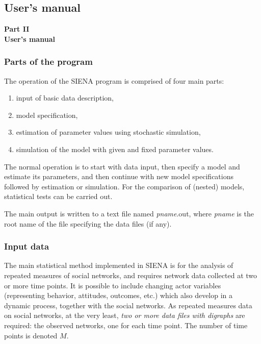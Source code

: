 \documentclass[a4paper,fleqn]{article}
\newcommand{\+}{\, + \,}
\newcommand{\SI}{{\sf SIENA }}
\begin{document}
{\begin{print}
\part{User's manual}
\end{print}
\begin{screen}
{\color{section0}\LARGE\bf\noindent
Part II\\[1.5ex] User's manual\\[1.8ex]}
\end{screen}


\begin{print}
\end{print}

\section[Program parts]{Parts of the program}
\label{S_parts}

The operation of the \SI program is comprised of four main parts:
\begin{enumerate}
 \item input of basic data description,
 \item model specification,
 \item estimation of parameter values using stochastic simulation,
 \item simulation of the model with given and fixed parameter values.
\end{enumerate}

The normal operation is to start with data input, then specify a
model and estimate its parameters, and then continue with new
model specifications followed by estimation or simulation. For the
comparison of (nested) models, statistical tests can be carried out.


The main output is written to a text file named \textsf{{\em
pname}.out}, where \textsf{{\em pname}} is the root name of the
file specifying the data files (if any).

\begin{print}
\newpage
\end{print}

\section{Input data}
\label{S_InputData}

The main statistical method implemented in \SI  is for the analysis
of repeated measures of social networks, and requires network data
collected at two or more time points. It is possible to include
changing actor variables (representing behavior, attitudes,
outcomes, etc.) which also develop in a dynamic process, together
with the social networks.
As repeated measures data on social networks, at the very least, {\em two or more data
files with digraphs} are required: the observed networks, one for
each time point. The number of time points is denoted $M$.


}
\end{document}

